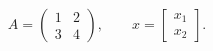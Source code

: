 \documentclass{article}
\begin{document}
\[
  A=\begin{pmatrix}1&2\\3&4\end{pmatrix},
  \qquad
  x=\begin{bmatrix}x_1\\x_2\end{bmatrix}.
\]
\end{document}

